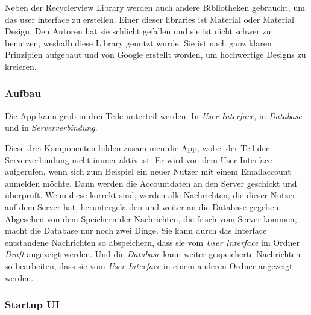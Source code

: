 \documentclass[a4paper,11pt]{article}
\begin{document}
Neben der Recyclerview Library werden auch andere Bibliotheken gebraucht, um das \gls{user interface} zu erstellen. Einer dieser libraries ist Material oder Material Design. 
Den Autoren hat sie schlicht gefallen und sie ist nicht schwer zu benutzen, weshalb diese Library genutzt wurde. Sie ist nach ganz klaren Prinzipien aufgebaut 
und von Google erstellt worden, um hochwertige Designs zu kreieren. \cite{materialDesigne}

\endgroup

\subsubsection{Aufbau}

Die App kann grob in drei Teile unterteil werden. In \textit{User Interface}, in \textit{Database} und in \textit{Serververbindung}. 

\begingroup
\setlength{\intextsep}{7pt}
\setlength{\columnsep}{15pt}


\nohyphenation

Diese drei Komponenten bilden zusam-men die App, wobei der Teil der Serververbindung nicht immer aktiv ist. Er wird von dem User Interface
aufgerufen, wenn sich zum Beispiel ein neuer Nutzer mit einem Emailaccount anmelden möchte. Dann werden die Accountdaten an den Server geschickt und überprüft.
Wenn diese korrekt sind, werden alle Nachrichten, die dieser Nutzer auf dem Server hat, heruntergela-den und weiter an die Database gegeben. Abgesehen von dem 
Speichern der Nachrichten, die frisch vom Server kommen, macht die Database nur noch zwei Dinge. Sie kann durch das Interface entstandene Nachrichten so abspeichern, dass sie 
vom \textit{User Interface} im Ordner \textit{Draft} angezeigt werden. Und die \textit{Database} kann weiter gespeicherte Nachrichten so bearbeiten, dass sie vom 
\textit{User Interface} in einem anderen Ordner angezeigt werden.

\endgroup

\subsubsection{Startup UI}


\end{document}

